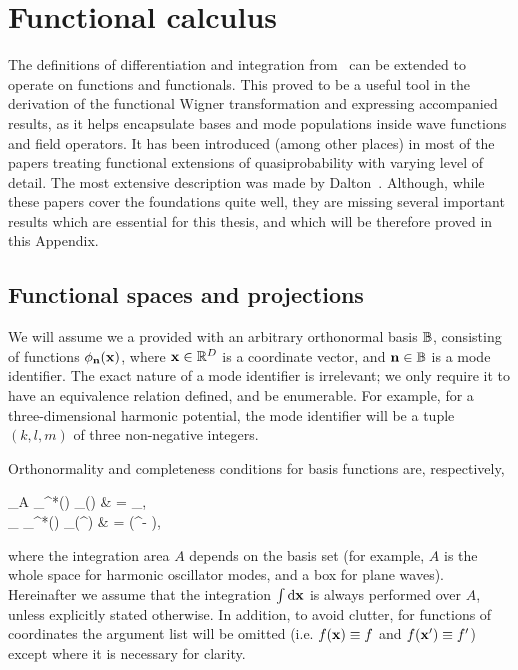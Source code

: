 \chapter{Functional calculus}
\label{cha:appendix:func-calculus}

The definitions of differentiation and integration from~ can be extended to operate on functions and functionals.
This proved to be a useful tool in the derivation of the functional Wigner transformation and expressing accompanied results, as it helps encapsulate bases and mode populations inside wave functions and field operators.
It has been introduced (among other places) in most of the papers treating functional extensions of quasiprobability with varying level of detail.
The most extensive description was made by Dalton~\cite{Dalton2011}.
Although, while these papers cover the foundations quite well, they are missing several important results which are essential for this thesis, and which will be therefore proved in this Appendix.


\section{Functional spaces and projections}

We will assume we a provided with an arbitrary orthonormal basis $\mathbb{B}$, consisting of functions $\phi_{\mathbf{n}}(\mathbf{x})$, where $\mathbf{x} \in \mathbb{R}^D$ is a coordinate vector, and $\mathbf{n} \in \mathbb{B}$ is a mode identifier.
The exact nature of a mode identifier is irrelevant; we only require it to have an equivalence relation defined, and be enumerable.
For example, for a three-dimensional harmonic potential, the mode identifier will be a tuple $(k,l,m)$ of three non-negative integers.

Orthonormality and completeness conditions for basis functions are, respectively,
\begin{eqns}
	\int\limits_A \phi_{\nvec}^*(\xvec) \phi_{\mvec}(\xvec) \upd\xvec
	& = \delta_{\nvec\mvec}, \\
	\sum_{\nvec \in \fullbasis} \phi_{\nvec}^*(\xvec) \phi_{\nvec}(\xvec^\prime)
	& = \delta(\xvec^\prime - \xvec),
\end{eqns}
where the integration area $A$ depends on the basis set (for example, $A$ is the whole space for harmonic oscillator modes, and a box for plane waves).
Hereinafter we assume that the integration $\int \mathrm{d}\mathbf{x}$ is always performed over $A$, unless explicitly stated otherwise. In addition, to avoid clutter, for functions of coordinates the argument list will be omitted (i.e. $f(\mathbf{x}) \equiv f$ and $f(\mathbf{x}^\prime) \equiv f^\prime$) except where it is necessary for clarity.

